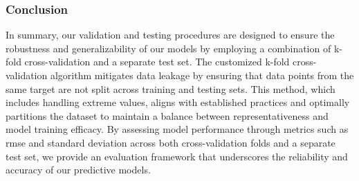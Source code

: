 \subsubsection{Conclusion}
In summary, our validation and testing procedures are designed to ensure the robustness and generalizability of our models by employing a combination of k-fold cross-validation and a separate test set.
The customized k-fold cross-validation algorithm mitigates data leakage by ensuring that data points from the same target are not split across training and testing sets.
This method, which includes handling extreme values, aligns with established practices and optimally partitions the dataset to maintain a balance between representativeness and model training efficacy.
By assessing model performance through metrics such as \gls{rmse} and standard deviation across both cross-validation folds and a separate test set, we provide an evaluation framework that underscores the reliability and accuracy of our predictive models.


